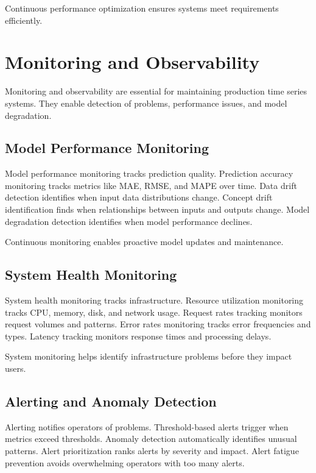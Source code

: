 Continuous performance optimization ensures systems meet requirements efficiently.

\section{Monitoring and Observability}

Monitoring and observability are essential for maintaining production time series systems. They enable detection of problems, performance issues, and model degradation.

\subsection{Model Performance Monitoring}

Model performance monitoring tracks prediction quality. Prediction accuracy monitoring tracks metrics like MAE, RMSE, and MAPE over time. Data drift detection identifies when input data distributions change. Concept drift identification finds when relationships between inputs and outputs change. Model degradation detection identifies when model performance declines.

Continuous monitoring enables proactive model updates and maintenance.

\subsection{System Health Monitoring}

System health monitoring tracks infrastructure. Resource utilization monitoring tracks CPU, memory, disk, and network usage. Request rates tracking monitors request volumes and patterns. Error rates monitoring tracks error frequencies and types. Latency tracking monitors response times and processing delays.

System monitoring helps identify infrastructure problems before they impact users.

\subsection{Alerting and Anomaly Detection}

Alerting notifies operators of problems. Threshold-based alerts trigger when metrics exceed thresholds. Anomaly detection automatically identifies unusual patterns. Alert prioritization ranks alerts by severity and impact. Alert fatigue prevention avoids overwhelming operators with too many alerts.


